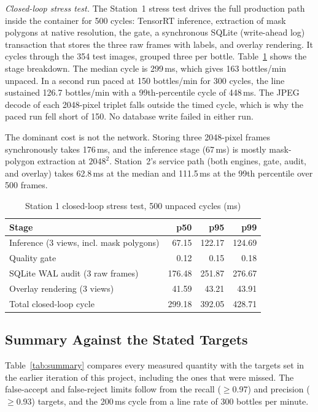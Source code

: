 \documentclass[conference]{IEEEtran}
\begin{document}
\textit{Closed-loop stress test.} The Station~1 stress test drives the full production path inside the container for 500 cycles: TensorRT inference, extraction of mask polygons at native resolution, the gate, a synchronous SQLite (write-ahead log) transaction that stores the three raw frames with labels, and overlay rendering. It cycles through the 354 test images, grouped three per bottle. Table~\ref{tab:stress} shows the stage breakdown. The median cycle is 299\,ms, which gives 163 bottles/min unpaced. In a second run paced at 150 bottles/min for 300 cycles, the line sustained 126.7 bottles/min with a 99th-percentile cycle of 448\,ms. The JPEG decode of each 2048-pixel triplet falls outside the timed cycle, which is why the paced run fell short of 150. No database write failed in either run.

The dominant cost is not the network. Storing three 2048-pixel frames synchronously takes 176\,ms, and the inference stage (67\,ms) is mostly mask-polygon extraction at $2048^2$. Station~2's service path (both engines, gate, audit, and overlay) takes 62.8\,ms at the median and 111.5\,ms at the 99th percentile over 500 frames.

\begin{table}[t]
\caption{Station 1 closed-loop stress test, 500 unpaced cycles (ms)}
\label{tab:stress}
\centering
\begin{tabular}{lrrr}
\toprule
Stage & p50 & p95 & p99\\
\midrule
Inference (3 views, incl. mask polygons) & 67.15 & 122.17 & 124.69\\
Quality gate & 0.12 & 0.15 & 0.18\\
SQLite WAL audit (3 raw frames) & 176.48 & 251.87 & 276.67\\
Overlay rendering (3 views) & 41.59 & 43.21 & 43.91\\
\midrule
Total closed-loop cycle & 299.18 & 392.05 & 428.71\\
\bottomrule
\end{tabular}
\end{table}

\subsection{Summary Against the Stated Targets}
Table~\ref{tab:summary} compares every measured quantity with the targets set in the earlier iteration of this project, including the ones that were missed. The false-accept and false-reject limits follow from the recall ($\geq$0.97) and precision ($\geq$0.93) targets, and the 200\,ms cycle from a line rate of 300 bottles per minute.
\end{document}
